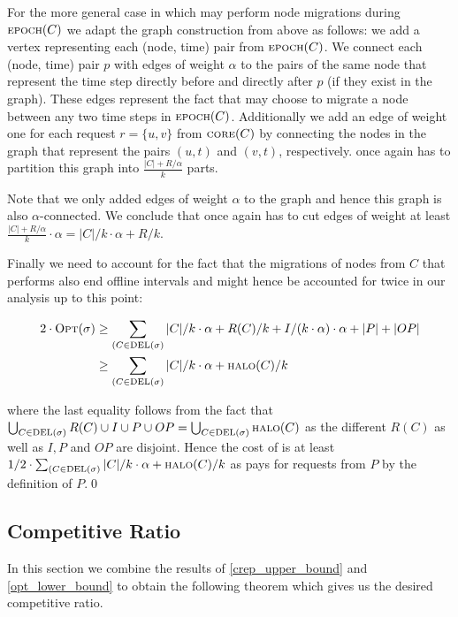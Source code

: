 \documentclass[a4paper,xcolor=dvipsnames, tikz, 12pt]{article}
\newcommand{\del}{\text{\scriptsize DEL}}
\newcommand{\opt}{\text{O{\scriptsize PT}}}
\newcommand{\core}{\text{\scriptsize CORE}}
\newcommand{\halo}{\text{\scriptsize HALO}}
\newcommand{\epoch}{\text{\scriptsize EPOCH}}
\theoremstyle{definition}
\begin{document}
For the more general case in which \opt{} may perform node migrations during $\epoch(C)$ we adapt the graph construction from above as follows: we add a vertex representing each (node, time) pair from $\epoch(C)$.
We connect each (node, time) pair $p$ with edges of weight $\alpha$ to the pairs of the same node that represent the time step directly before and directly after $p$ (if they exist in the graph). These edges represent the fact that \opt{} may choose to migrate a node between any two time steps in $\epoch(C)$.
Additionally we add an edge of weight one for each request $r=\{u,v\}$ from $\core(C)$ by connecting the nodes in the graph that represent the pairs $(u,t)$ and $(v,t)$, respectively. \opt{} once again has to partition this graph into $\frac{|C|+R/\alpha}{k}$ parts.

Note that we only added edges of weight $\alpha$ to the graph and hence this graph is also $\alpha$-connected. We conclude that once again \opt{} has to cut edges of weight at least $\frac{|C|+R/\alpha}{k}\cdot\alpha=|C|/k\cdot\alpha+R/k$.

Finally we need to account for the fact that the migrations of nodes from $C$ that \opt{} performs also end offline intervals and might hence be accounted for twice in our analysis up to this point:

\begingroup
	\addtolength{\jot}{1em}

	\begin{align*}
		2\cdot\opt(\sigma)&\geq\sum_{(C\in\del{}(\sigma)}|C|/k\cdot\alpha+R(C)/k+I/(k\cdot\alpha)\cdot\alpha+|P|+|OP|\\
		&\geq\sum_{(C\in\del{}(\sigma)}|C|/k\cdot\alpha+\halo(C)/k
	\end{align*}
\endgroup

where the last equality follows from the fact that 
$\bigcup_{C\in\del(\sigma)}R(C)\cup I\cup P\cup OP=\bigcup_{C\in\del(\sigma)}\halo(C)$ as the different $R(C)$ as well as $I, P$ and $OP$ are disjoint.
Hence the cost of \opt{} is at least $1/2\cdot\sum_{(C\in\del{}(\sigma)}|C|/k\cdot\alpha+\halo(C)/k$ as \opt{} pays for requests from $P$ by the definition of $P$.\qed


\subsection{Competitive Ratio}
In this section we combine the results of \cref{crep_upper_bound} and \cref{opt_lower_bound} to obtain the following theorem which gives us the desired competitive ratio.
\end{document}
